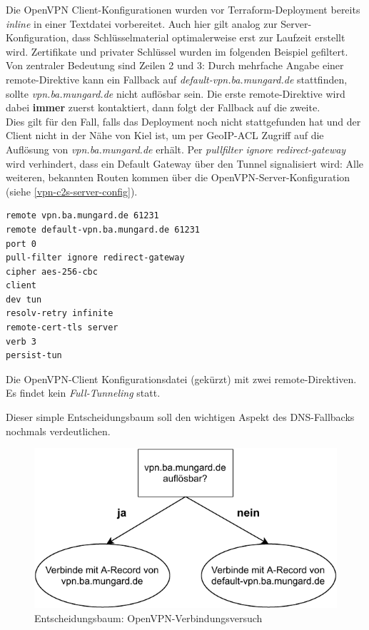 Die OpenVPN Client-Konfigurationen wurden vor Terraform-\gls{Deployment} bereits \textit{inline} in einer Textdatei vorbereitet. Auch hier gilt analog zur Server-Konfiguration, dass Schlüsselmaterial optimalerweise erst zur Laufzeit erstellt wird. Zertifikate und privater Schlüssel wurden im folgenden Beispiel gefiltert. Von zentraler Bedeutung sind Zeilen 2 und 3: Durch mehrfache Angabe einer remote-Direktive kann ein Fallback auf \textit{default-vpn.ba.mungard.de} stattfinden, sollte \textit{vpn.ba.mungard.de} nicht auflösbar sein. Die erste remote-Direktive wird dabei \textbf{immer} zuerst kontaktiert, dann folgt der Fallback auf die zweite.\\
Dies gilt für den Fall, falls das \gls{Deployment} noch nicht stattgefunden hat und der Client nicht in der Nähe von Kiel ist, um per GeoIP-ACL Zugriff auf die Auflösung von \textit{vpn.ba.mungard.de} erhält. Per \textit{pullfilter ignore redirect-gateway} wird verhindert, dass ein Default Gateway über den Tunnel signalisiert wird: Alle weiteren, bekannten Routen kommen über die OpenVPN-Server-Konfiguration (siehe \ref{vpn-c2s-server-config}).
\begin{listing}[h]
\begin{verbatim}
remote vpn.ba.mungard.de 61231
remote default-vpn.ba.mungard.de 61231
port 0
pull-filter ignore redirect-gateway
cipher aes-256-cbc
client
dev tun
resolv-retry infinite
remote-cert-tls server
verb 3
persist-tun

\end{verbatim}
\caption{Die OpenVPN-Client Konfigurationsdatei (gekürzt) mit zwei remote-Direktiven. Es findet kein \textit{Full-Tunneling} statt.}
\label{ovpn-client-conf}
\end{listing}\FloatBarrier
Dieser simple Entscheidungsbaum soll den wichtigen Aspekt des \glqq DNS-Fallbacks\grqq{} nochmals verdeutlichen.

\begin{figure}[h]
  \centering
  \includegraphics{Figures/entscheidungsbaum_openvpn_config.pdf}
  \caption{Entscheidungsbaum: OpenVPN-Verbindungsversuch}
  \label{grafik:Use-Case_2_Entscheidungsbaum_OpenVPN}
\end{figure}\FloatBarrier
\newpage
